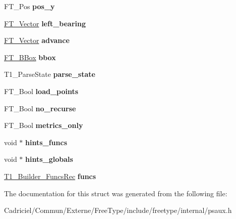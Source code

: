 \begin{DoxyCompactItemize}
\item 
F\+T\+\_\+\+Pos {\bfseries pos\+\_\+y}\hypertarget{struct_t1___builder_rec___ad389bf0d5182b677ed3dba05a9612530}{}\label{struct_t1___builder_rec___ad389bf0d5182b677ed3dba05a9612530}

\item 
\hyperlink{struct_f_t___vector__}{F\+T\+\_\+\+Vector} {\bfseries left\+\_\+bearing}\hypertarget{struct_t1___builder_rec___a86247b8fd87873ef93aecf0e27e4b6dc}{}\label{struct_t1___builder_rec___a86247b8fd87873ef93aecf0e27e4b6dc}

\item 
\hyperlink{struct_f_t___vector__}{F\+T\+\_\+\+Vector} {\bfseries advance}\hypertarget{struct_t1___builder_rec___a48575715ea96f16bdc7077996013ef9e}{}\label{struct_t1___builder_rec___a48575715ea96f16bdc7077996013ef9e}

\item 
\hyperlink{struct_f_t___b_box__}{F\+T\+\_\+\+B\+Box} {\bfseries bbox}\hypertarget{struct_t1___builder_rec___a534c6d954f8cf791a94489350314a8f7}{}\label{struct_t1___builder_rec___a534c6d954f8cf791a94489350314a8f7}

\item 
T1\+\_\+\+Parse\+State {\bfseries parse\+\_\+state}\hypertarget{struct_t1___builder_rec___afaa675cc3601ed05ed86bc474153094b}{}\label{struct_t1___builder_rec___afaa675cc3601ed05ed86bc474153094b}

\item 
F\+T\+\_\+\+Bool {\bfseries load\+\_\+points}\hypertarget{struct_t1___builder_rec___acaf59a770471bf90b5b7d9f72e97e64e}{}\label{struct_t1___builder_rec___acaf59a770471bf90b5b7d9f72e97e64e}

\item 
F\+T\+\_\+\+Bool {\bfseries no\+\_\+recurse}\hypertarget{struct_t1___builder_rec___a0369f22bec404666e1c7dc6bb648ac28}{}\label{struct_t1___builder_rec___a0369f22bec404666e1c7dc6bb648ac28}

\item 
F\+T\+\_\+\+Bool {\bfseries metrics\+\_\+only}\hypertarget{struct_t1___builder_rec___ab4c509b363e5a5f4da25460413e9364f}{}\label{struct_t1___builder_rec___ab4c509b363e5a5f4da25460413e9364f}

\item 
void $\ast$ {\bfseries hints\+\_\+funcs}\hypertarget{struct_t1___builder_rec___aeed4b5ebe5256cc07e31159b4a4a95ff}{}\label{struct_t1___builder_rec___aeed4b5ebe5256cc07e31159b4a4a95ff}

\item 
void $\ast$ {\bfseries hints\+\_\+globals}\hypertarget{struct_t1___builder_rec___ae94605dc79c1d54c1b59423046b38671}{}\label{struct_t1___builder_rec___ae94605dc79c1d54c1b59423046b38671}

\item 
\hyperlink{struct_t1___builder___funcs_rec__}{T1\+\_\+\+Builder\+\_\+\+Funcs\+Rec} {\bfseries funcs}\hypertarget{struct_t1___builder_rec___acecf3c6c134bccd36a1d30e10147ca54}{}\label{struct_t1___builder_rec___acecf3c6c134bccd36a1d30e10147ca54}

\end{DoxyCompactItemize}


The documentation for this struct was generated from the following file\+:\begin{DoxyCompactItemize}
\item 
Cadriciel/\+Commun/\+Externe/\+Free\+Type/include/freetype/internal/psaux.\+h\end{DoxyCompactItemize}
